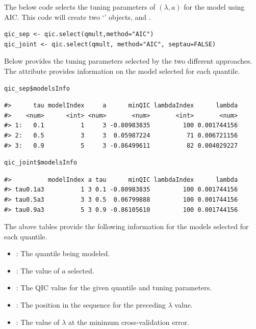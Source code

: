 The below code selects the tuning parameters of \((\lambda,a)\) for the  model using AIC. This code will create two `' objects,  and .

\begin{verbatim}
qic_sep <- qic.select(qmult,method="AIC")
qic_joint <- qic.select(qmult, method="AIC", septau=FALSE)
\end{verbatim}

Below provides the tuning parameters selected by the two different approaches. The  attribute provides information on the model selected for each quantile.

\begin{verbatim}
qic_sep$modelsInfo
\end{verbatim}

\begin{verbatim}
#>      tau modelIndex     a      minQIC lambdaIndex      lambda
#>    <num>      <int> <num>       <num>       <int>       <num>
#> 1:   0.1          1     3 -0.80983835         100 0.001744156
#> 2:   0.5          3     3  0.05987224          71 0.006721156
#> 3:   0.9          5     3 -0.86499611          82 0.004029227
\end{verbatim}

\begin{verbatim}
qic_joint$modelsInfo
\end{verbatim}

\begin{verbatim}
#>          modelIndex a tau      minQIC lambdaIndex      lambda
#> tau0.1a3          1 3 0.1 -0.80983835         100 0.001744156
#> tau0.5a3          3 3 0.5  0.06799888         100 0.001744156
#> tau0.9a3          5 3 0.9 -0.86105610         100 0.001744156
\end{verbatim}

The above tables provide the following information for the models selected for each quantile.

\begin{itemize}
\item {}: The quantile being modeled.
\item {}: The value of $a$ selected.
\item {}: The QIC value for the given quantile and tuning parameters.
\item {}: The position in the sequence for the preceding $\lambda$ value.
\item {}: The value of $\lambda$ at the minimum cross-validation error.
\end{itemize}

